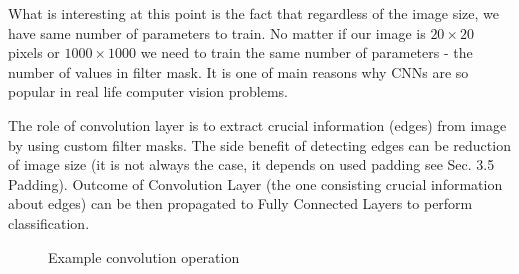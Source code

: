 What is interesting at this point is the fact that regardless of the image size, we have same number of parameters to train. No matter if our image is $20 \times 20$ pixels or $1000 \times 1000$ we need to train the same number of parameters - the number of values in filter mask. It is one of main reasons why CNNs are so popular in real life computer vision problems.

The role of convolution layer is to extract crucial information (edges) from image by using custom filter masks. The side benefit of detecting edges can be reduction of image size (it is not always the case, it depends on used padding see Sec. 3.5 Padding). Outcome of Convolution Layer (the one consisting crucial information about edges) can be then propagated to Fully Connected Layers to perform classification.


   \begin{figure}[!ht]
  \centering
  \caption{Example convolution operation}
  \label{figurelabel}
\end{figure}    



